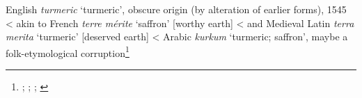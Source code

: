 \begin{etymology}\label{ety:turmeric}
English \textit{turmeric} `turmeric', obscure origin (by alteration of earlier forms), 1545
< akin to French \textit{terre mérite} `saffron' [worthy earth]
< and Medieval Latin \textit{terra merita} `turmeric' [deserved earth]
< Arabic \textit{kurkum} `turmeric; saffron', maybe a folk-etymological corruption\footnote{\textcite[s.v. turmeric]{oed}; \textcite[s.v. turmeric]{oe}; \textcite{guthrie_trade-language_2009}; \textcite[789]{klein_comprehensive_1971}}
\end{etymology}